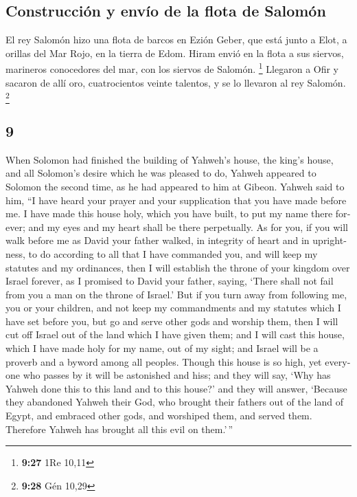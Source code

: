 \begin{paracol}{2}
\hypertarget{construcciuxf3n-y-envuxedo-de-la-flota-de-salomuxf3n}{%
\subsection{Construcción y envío de la flota de
Salomón}\label{construcciuxf3n-y-envuxedo-de-la-flota-de-salomuxf3n}}

 El rey Salomón hizo una flota de barcos en Ezión Geber,
que está junto a Elot, a orillas del Mar Rojo, en la tierra de Edom.
 Hiram envió en la flota a sus siervos, marineros
conocedores del mar, con los siervos de Salomón. \footnote{\textbf{9:27}
  1Re 10,11}  Llegaron a Ofir y sacaron de allí oro,
cuatrocientos veinte talentos, y se lo llevaron al rey Salomón.
\footnote{\textbf{9:28} Gén 10,29}

\switchcolumn
\begin{otherlanguage}{english}

\hypertarget{section-17}{%
\section{9}\label{section-17}}

 When Solomon had finished the building of Yahweh's house,
the king's house, and all Solomon's desire which he was pleased to do,
 Yahweh appeared to Solomon the second time, as he had
appeared to him at Gibeon.  Yahweh said to him, ``I have
heard your prayer and your supplication that you have made before me. I
have made this house holy, which you have built, to put my name there
forever; and my eyes and my heart shall be there perpetually.
 As for you, if you will walk before me as David your
father walked, in integrity of heart and in uprightness, to do according
to all that I have commanded you, and will keep my statutes and my
ordinances,  then I will establish the throne of your
kingdom over Israel forever, as I promised to David your father, saying,
`There shall not fail from you a man on the throne of Israel.'
 But if you turn away from following me, you or your
children, and not keep my commandments and my statutes which I have set
before you, but go and serve other gods and worship them, 
then I will cut off Israel out of the land which I have given them; and
I will cast this house, which I have made holy for my name, out of my
sight; and Israel will be a proverb and a byword among all peoples.
 Though this house is so high, yet everyone who passes by
it will be astonished and hiss; and they will say, `Why has Yahweh done
this to this land and to this house?'  and they will
answer, `Because they abandoned Yahweh their God, who brought their
fathers out of the land of Egypt, and embraced other gods, and worshiped
them, and served them. Therefore Yahweh has brought all this evil on
them.'\,''


\end{otherlanguage}
\end{paracol}

